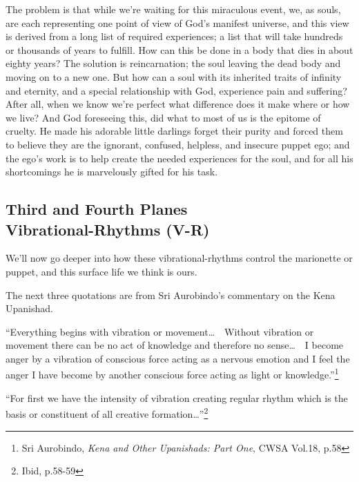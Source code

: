 \documentclass[12pt,a4paper]{book}
\begin{document}
The problem is that while we're waiting for this miraculous event, we,
as souls, are each representing one point of view of God's manifest
universe, and this view is derived from a long list of required
experiences; a list that will take hundreds or thousands of years to
fulfill. How can this be done in a body that dies in about eighty
years? The solution is reincarnation; the soul leaving the dead body
and moving on to a new one. But how can a soul with its inherited
traits of infinity and eternity, and a special relationship with God,
experience pain and suffering? After all, when we know we're perfect
what difference does it make where or how we live? And God foreseeing
this, did what to most of us is the epitome of cruelty. He made his
adorable little darlings forget their purity and forced them to
believe they are the ignorant, confused, helpless, and insecure puppet
ego; and the ego's work is to help create the needed experiences for
the soul, and for all his shortcomings he is marvelously gifted for
his task.


\newpage
\begin{center}\section*{Third and Fourth Planes\\Vibrational-Rhythms (V-R)}\end{center}

We'll now go deeper into how these vibrational-rhythms control the
marionette or puppet, and this surface life we think is ours.

The next three quotations are from Sri Aurobindo's commentary on the
Kena Upanishad.

``Everything begins with vibration or movement\ldots\ \ Without
vibration or movement there can be no act of knowledge and therefore
no sense\ldots\ \ I become anger by a vibration of conscious force
acting as a nervous emotion and I feel the anger I have become by
another conscious force acting as light or knowledge.''\footnote{Sri
  Aurobindo, \emph{Kena and Other Upanishads: Part One}, CWSA Vol.18, p.58}


``For first we have the intensity of vibration creating regular rhythm
which is the basis or constituent of all creative
formation\ldots''\footnote{Ibid, p.58-59}
\end{document}
